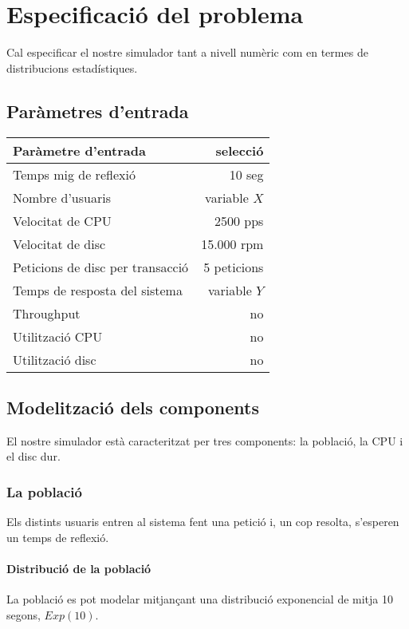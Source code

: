 \section{Especificació del problema}

Cal especificar el nostre simulador tant a nivell numèric com en termes de
distribucions estadístiques.

\subsection{Paràmetres d'entrada}

\begin{tabular}{lr}
Paràmetre d'entrada & selecció \\
\toprule
Temps mig de reflexió  & 10 seg \\
Nombre d'usuaris & variable $X$ \\
Velocitat de CPU & 2500 pps \\
Velocitat de disc & 15.000 rpm \\
Peticions de disc per transacció & 5 peticions \\
Temps de resposta del sistema & variable $Y$ \\
Throughput & no \\
Utilització CPU & no \\
Utilització disc & no \\ 
\end{tabular}

\subsection{Modelització dels components}

El nostre simulador està caracteritzat per tres components: la població, la CPU
i el disc dur.

\subsubsection{La població}

Els distints usuaris entren al sistema fent una petició i, un cop resolta,
s'esperen un temps de reflexió.

\paragraph{Distribució de la població}

La població es pot modelar mitjançant una distribució exponencial de mitja 10
segons, $Exp(10)$.

